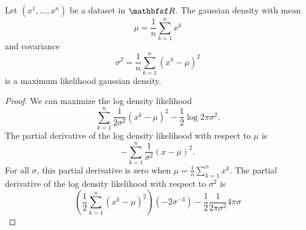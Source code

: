 \begin{prop}
Let $(x^1, \dots, x^n)$ be a dataset in $\R$.
The gaussian density with mean
\[
  \mu = \frac{1}{n} \sum_{k = 1}^{n} x^k
\]
and covariance
\[
  \sigma^2 = \frac{1}{n} \sum_{k = 1}^{n} (x^k - \mu)^2
\]
is a maximum likelihood gaussian density.
\begin{proof}
  We can maximize the log density likelihood
  \[
    \sum_{k = 1}^{n} \frac{1}{2\sigma^2}(x^k - \mu)^2 - \frac{1}{2}\log2\pi\sigma^2.
  \]
  The partial derivative of the log density likelihood with
  respect to $\mu$ is
  \[
    - \sum_{k = 1}^{n} \frac{1}{\sigma^2}(x - \mu)^2.
  \]
  For all $\sigma$, this partial derivative is zero
  when $\mu = \frac{1}{n} \sum_{k = 1}^{n} x^k$.
  The partial derivative of the log density likelihood with
  respect to $\sigma^2$ is
  \[
    \left(\frac{1}{2}\sum_{k = 1}^{n}(x^k - \mu)^2\right)(-2 \sigma^{-3}) - \frac{1}{2} \frac{1}{2\pi \sigma^2} 4\pi\sigma
  \]
\end{proof}
\end{prop}
\strats
